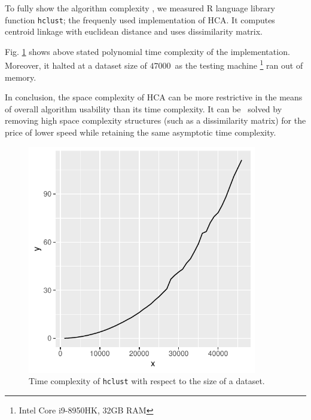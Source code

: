 To fully show the algorithm complexity , we measured R language library function \texttt{hclust}; the frequenly used implementation of HCA. It computes centroid linkage with euclidean distance and uses dissimilarity matrix. 

Fig. \ref{fig01:hclust} shows above stated polynomial time complexity of the implementation. Moreover, it halted at a dataset size of $47 000$\ as the testing machine \footnote{Intel Core i9-8950HK, 32GB RAM} ran out of memory.

In conclusion, the space complexity of HCA can be more restrictive in the means of overall algorithm usability than its time complexity. It can be \ solved by removing high space complexity structures (such as a dissimilarity matrix) for the price of lower speed while retaining the same asymptotic time complexity.

\begin{figure}\centering
	\includegraphics[width=10cm]{img/hclust}
	\caption{Time complexity of \texttt{hclust} with respect to the size of a dataset. }
	\label{fig01:hclust}
\end{figure}
